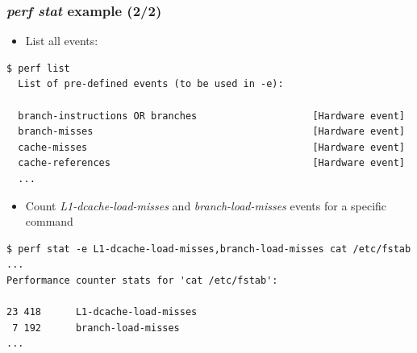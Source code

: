 \begin{frame}[fragile]
  \frametitle{{\em perf stat} example (2/2)}
  \begin{itemize}
    \item List all events:
  \end{itemize}
  \begin{block}{}
    \begin{verbatim}
$ perf list
  List of pre-defined events (to be used in -e):

  branch-instructions OR branches                    [Hardware event]
  branch-misses                                      [Hardware event]
  cache-misses                                       [Hardware event]
  cache-references                                   [Hardware event]
  ...
    \end{verbatim}
  \end{block}
  \begin{itemize}
    \item Count {\em L1-dcache-load-misses} and {\em branch-load-misses} events for a
          specific command
  \end{itemize}
  \begin{block}{}
    \begin{verbatim}
$ perf stat -e L1-dcache-load-misses,branch-load-misses cat /etc/fstab
...
Performance counter stats for 'cat /etc/fstab':

23 418      L1-dcache-load-misses
 7 192      branch-load-misses
...
    \end{verbatim}
  \end{block}
\end{frame}

